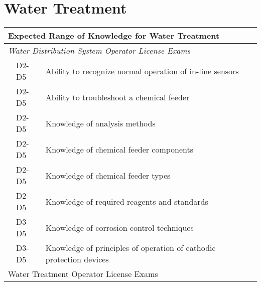 \chapter{Water Treatment}



\begin{table}[H]
\begin{tabular}{| m{1cm} | m{1cm} | m{12cm} |}
\hline
\multicolumn{3}{|l|}{\textbf{Expected   Range of Knowledge for Water Treatment}}                                                                         \\ \hline
\multicolumn{3}{|l|}{\textit{Water   Distribution System Operator License Exams}}                                                                        \\ \hline
\multicolumn{1}{l|}{} & \multicolumn{1}{l|}{D2-D5} & Ability to recognize   normal operation of in-line sensors                                 \\ \cline{2-3} 
\multicolumn{1}{l|}{} & \multicolumn{1}{l|}{D2-D5} & Ability to   troubleshoot a chemical feeder                                                \\ \cline{2-3} 
\multicolumn{1}{l|}{} & \multicolumn{1}{l|}{D2-D5} & Knowledge of analysis   methods                                                            \\ \cline{2-3} 
\multicolumn{1}{l|}{} & \multicolumn{1}{l|}{D2-D5} & Knowledge of chemical   feeder components                                                  \\ \cline{2-3} 
\multicolumn{1}{l|}{} & \multicolumn{1}{l|}{D2-D5} & Knowledge of chemical   feeder types                                                       \\ \cline{2-3} 
\multicolumn{1}{l|}{} & \multicolumn{1}{l|}{D2-D5} & Knowledge of required   reagents and standards                                             \\ \cline{2-3} 
\multicolumn{1}{l|}{} & \multicolumn{1}{l|}{D3-D5} & Knowledge of   corrosion control techniques                                                \\ \cline{2-3} 
\multicolumn{1}{l|}{} & \multicolumn{1}{l|}{D3-D5} & Knowledge of   principles of operation of cathodic protection devices                      \\ \hline
\multicolumn{3}{|l|}{Water   Treatment Operator License Exams}                                                                                  \\ \hline

\end{tabular}
\end{table}
